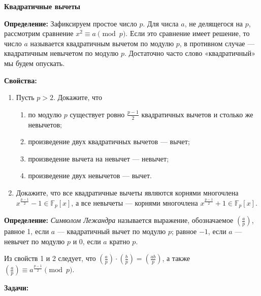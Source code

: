 \documentclass{article}
\begin{document}
\large
	
\begin{center}
	\textbf{Квадратичные вычеты}
\end{center}

\textbf{Определение:} 
Зафиксируем простое число $p$. Для числа $a$, не делящегося на $p$, рассмотрим сравнение $x^2 \equiv a \pmod{p}$. Если это сравнение имеет решение, то число $a$ называется квадратичным вычетом по модулю $p$, в противном случае — квадратичным невычетом по модулю $p$. Достаточно часто слово «квадратичный» мы будем опускать.

\textbf{Свойства:}  

\begin{enumerate}[label*=\protect\fbox{\arabic{enumi}}]
	
\item Пусть $p > 2$. Докажите, что

\begin{enumerate}
	
	\item по модулю $p$ существует ровно $\frac{p-1}{2}$ квадратичных вычетов и столько же невычетов;
	
	\item произведение двух квадратичных вычетов — вычет; 
	
	\item произведение вычета на невычет — невычет;
	
	\item произведение двух невычетов — вычет.
	
\end{enumerate}

\item Докажите, что все квадратичные вычеты являются корнями многочлена $x^{\frac{p-1}{2}} - 1 \in \mathbb{F}_p[x]$, а все невычеты — корнями многочлена $x^{\frac{p-1}{2}} + 1 \in \mathbb{F}_p[x]$.

\end{enumerate}

\textbf{Определение:} \textit{Символом Лежандра} называется выражение, обозначаемое $\left(\frac{a}{p}\right)$, равное 1, если $a$ — квадратичный вычет по модулю $p$; равное $-1$, если $a$ — невычет по модулю $p$ и 0, если $a$ кратно $p$. 

Из свойств 1 и 2 следует, что $\left(\frac{a}{p}\right) \cdot \left(\frac{b}{p}\right) = \left(\frac{ab}{p}\right)$, а также $\left(\frac{a}{p}\right) \equiv a^{\frac{p-1}{2}} \pmod{p}$.

\textbf{Задачи:}  
\end{document}
